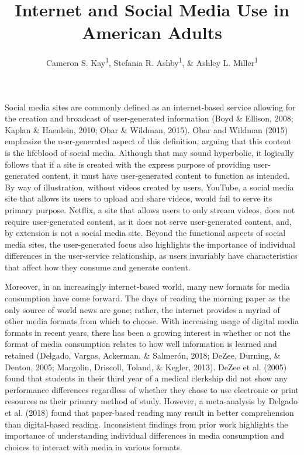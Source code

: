 \documentclass[man, fleqn, noextraspace]{apa6}
\title{Internet and Social Media Use in American Adults}
\author{Cameron S. Kay\textsuperscript{1}, Stefania R. Ashby\textsuperscript{1},
\& Ashley L. Miller\textsuperscript{1}}
\date{}
\affiliation{
\vspace{0.5cm}
\textsuperscript{1} University of Oregon}
\theoremstyle{definition}
\theoremstyle{definition}
\theoremstyle{definition}
\theoremstyle{remark}
\begin{document}
\maketitle

Social media sites are commonly defined as an internet-based service
allowing for the creation and broadcast of user-generated information
(Boyd \& Ellison, 2008; Kaplan \& Haenlein, 2010; Obar \& Wildman,
2015). Obar and Wildman (2015) emphasize the user-generated aspect of
this definition, arguing that this content is the lifeblood of social
media. Although that may sound hyperbolic, it logically follows that if
a site is created with the express purpose of providing user-generated
content, it must have user-generated content to function as intended. By
way of illustration, without videos created by users, YouTube, a social
media site that allows its users to upload and share videos, would fail
to serve its primary purpose. Netflix, a site that allows users to only
stream videos, does not require user-generated content, as it does not
serve user-generated content, and, by extension is not a social media
site. Beyond the functional aspects of social media sites, the
user-generated focus also highlights the importance of individual
differences in the user-service relationship, as users invariably have
characteristics that affect how they consume and generate content.

Moreover, in an increasingly internet-based world, many new formats for
media consumption have come forward. The days of reading the morning
paper as the only source of world news are gone; rather, the internet
provides a myriad of other media formats from which to choose. With
increasing usage of digital media formats in recent years, there has
been a growing interest in whether or not the format of media
consumption relates to how well information is learned and retained
(Delgado, Vargas, Ackerman, \& Salmerón, 2018; DeZee, Durning, \&
Denton, 2005; Margolin, Driscoll, Toland, \& Kegler, 2013). DeZee et al.
(2005) found that students in their third year of a medical clerkship
did not show any performance differences regardless of whether they
chose to use electronic or print resources as their primary method of
study. However, a meta-analysis by Delgado et al. (2018) found that
paper-based reading may result in better comprehension than
digital-based reading. Inconsistent findings from prior work highlights
the importance of understanding individual differences in media
consumption and choices to interact with media in various formats.
\end{document}
